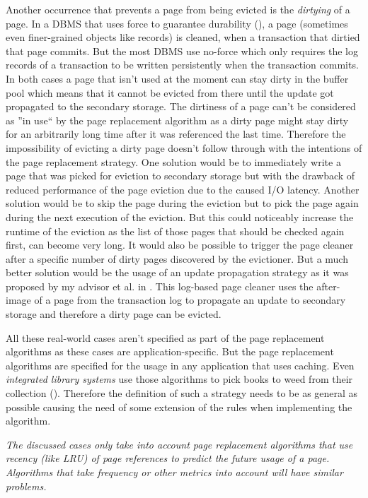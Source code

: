 	Another occurrence that prevents a page from being evicted is the \emph{dirtying} of a page. In a DBMS that uses force to guarantee durability (\cite{Haerder:1983b}), a page (sometimes even finer-grained objects like records) is cleaned, when a transaction that dirtied that page commits. But the most DBMS use no-force which only requires the log records of a transaction to be written persistently when the transaction commits. In both cases a page that isn't used at the moment can stay dirty in the buffer pool which means that it cannot be evicted from there until the update got propagated to the secondary storage. The dirtiness of a page can't be considered as ''in use`` by the page replacement algorithm as a dirty page might stay dirty for an arbitrarily long time after it was referenced the last time. Therefore the impossibility of evicting a dirty page doesn't follow through with the intentions of the page replacement strategy. One solution would be to immediately write a page that was picked for eviction to secondary storage but with the drawback of reduced performance of the page eviction due to the caused I/O latency. Another solution would be to skip the page during the eviction but to pick the page again during the next execution of the eviction. But this could noticeably increase the runtime of the eviction as the list of those pages that should be checked again first, can become very long. It would also be possible to trigger the page cleaner after a specific number of dirty pages discovered by the evictioner. But a much better solution would be the usage of an update propagation strategy as it was proposed by my advisor et al. in \cite{Sauer:2016}. This log-based page cleaner uses the after-image of a page from the transaction log to propagate an update to secondary storage and therefore a dirty page can be evicted.
	
	All these real-world cases aren't specified as part of the page replacement algorithms as these cases are application-specific. But the page replacement algorithms are specified for the usage in any application that uses caching. Even \emph{integrated library systems} use those algorithms to pick books to weed from their collection (\cite{ChuckFinley}). Therefore the definition of such a strategy needs to be as general as possible causing the need of some extension of the rules when implementing the algorithm.
	
	\textit{The discussed cases only take into account page replacement algorithms that use recency (like LRU) of page references to predict the future usage of a page. Algorithms that take frequency or other metrics into account will have similar problems.}

